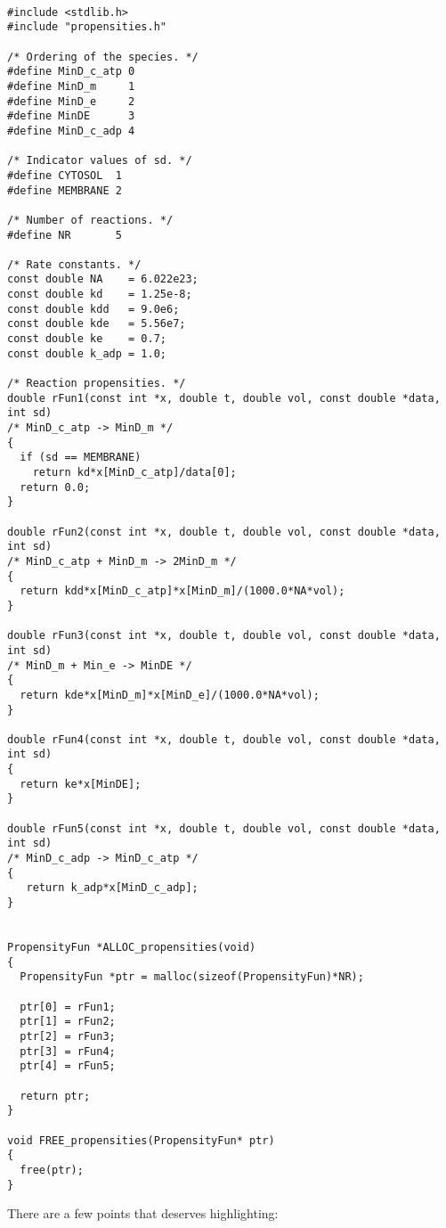 \begin{verbatim}

#include <stdlib.h>
#include "propensities.h"

/* Ordering of the species. */
#define MinD_c_atp 0
#define MinD_m     1
#define MinD_e     2
#define MinDE      3
#define MinD_c_adp 4

/* Indicator values of sd. */
#define CYTOSOL  1
#define MEMBRANE 2

/* Number of reactions. */
#define NR       5

/* Rate constants. */
const double NA    = 6.022e23;
const double kd    = 1.25e-8;
const double kdd   = 9.0e6; 
const double kde   = 5.56e7;
const double ke    = 0.7;
const double k_adp = 1.0;

/* Reaction propensities. */
double rFun1(const int *x, double t, double vol, const double *data, int sd)
/* MinD_c_atp -> MinD_m */
{
  if (sd == MEMBRANE) 
    return kd*x[MinD_c_atp]/data[0];
  return 0.0;
}

double rFun2(const int *x, double t, double vol, const double *data, int sd)
/* MinD_c_atp + MinD_m -> 2MinD_m */
{
  return kdd*x[MinD_c_atp]*x[MinD_m]/(1000.0*NA*vol);
}

double rFun3(const int *x, double t, double vol, const double *data, int sd)
/* MinD_m + Min_e -> MinDE */
{
  return kde*x[MinD_m]*x[MinD_e]/(1000.0*NA*vol);
}

double rFun4(const int *x, double t, double vol, const double *data, int sd)
{
  return ke*x[MinDE];
}

double rFun5(const int *x, double t, double vol, const double *data, int sd)
/* MinD_c_adp -> MinD_c_atp */
{
   return k_adp*x[MinD_c_adp];
}


PropensityFun *ALLOC_propensities(void)
{
  PropensityFun *ptr = malloc(sizeof(PropensityFun)*NR);
  
  ptr[0] = rFun1;
  ptr[1] = rFun2;
  ptr[2] = rFun3;
  ptr[3] = rFun4;
  ptr[4] = rFun5;

  return ptr;
}

void FREE_propensities(PropensityFun* ptr)
{
  free(ptr);
}
\end{verbatim}

\noindent
There are a few points that deserves highlighting:

